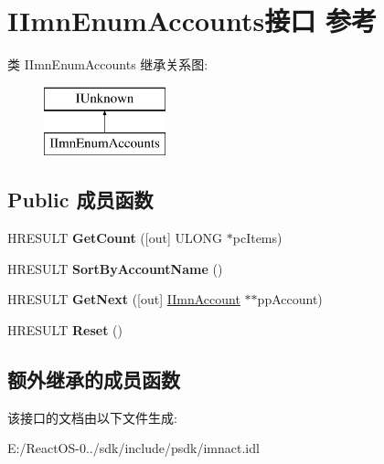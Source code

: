 \hypertarget{interface_i_imn_enum_accounts}{}\section{I\+Imn\+Enum\+Accounts接口 参考}
\label{interface_i_imn_enum_accounts}
类 I\+Imn\+Enum\+Accounts 继承关系图\+:\begin{figure}[H]
\begin{center}
\leavevmode
\includegraphics[height=2.000000cm]{interface_i_imn_enum_accounts}
\end{center}
\end{figure}
\subsection*{Public 成员函数}
\begin{DoxyCompactItemize}
\item 
\mbox{\label{interface_i_imn_enum_accounts_a777a7668749071aab0f4133917d52885}} 
H\+R\+E\+S\+U\+LT {\bfseries Get\+Count} (\mbox{[}out\mbox{]} U\+L\+O\+NG $\ast$pc\+Items)
\item 
\mbox{\label{interface_i_imn_enum_accounts_a20483cbbde9d0b91f1af577c6d6e4814}} 
H\+R\+E\+S\+U\+LT {\bfseries Sort\+By\+Account\+Name} ()
\item 
\mbox{\label{interface_i_imn_enum_accounts_a8515b96e2f56357d7e36d56ff5e047c1}} 
H\+R\+E\+S\+U\+LT {\bfseries Get\+Next} (\mbox{[}out\mbox{]} \hyperlink{interface_i_imn_account}{I\+Imn\+Account} $\ast$$\ast$pp\+Account)
\item 
\mbox{\label{interface_i_imn_enum_accounts_ad86553817690a6beed617885500d1ac1}} 
H\+R\+E\+S\+U\+LT {\bfseries Reset} ()
\end{DoxyCompactItemize}
\subsection*{额外继承的成员函数}


该接口的文档由以下文件生成\+:\begin{DoxyCompactItemize}
\item 
E\+:/\+React\+O\+S-\/0../sdk/include/psdk/imnact.\+idl\end{DoxyCompactItemize}
